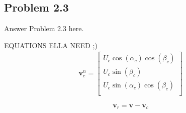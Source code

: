 \subsection*{Problem 2.3}

Answer Problem 2.3 here.

EQUATIONS ELLA NEED ;)
\begin{equation}
    \begin{aligned}
    \mathbf{v}_c^n 
    =
    \begin{bmatrix}
    U_c \cos(\alpha_c) \cos(\beta_c) \\
    U_c \sin(\beta_c) \\
    U_c \sin(\alpha_c) \cos(\beta_c)\\
    \end{bmatrix}
    \label{eq:v_n_c}
    \end{aligned}
\end{equation}

\begin{equation}
    \boldsymbol{v}_r = \boldsymbol{v} - \boldsymbol{v}_c
    \label{eq_v_r}
\end{equation}
